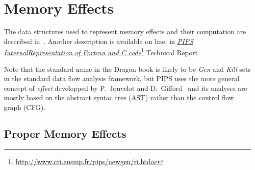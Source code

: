 \documentclass[a4paper]{report}
\newcommand{\LINK}[2]{\href{#2}{#1}\footnote{\url{#2}}\xspace}
\newcommand{\Pri}{\LINK{\emph{PIPS Internal\space{}Representation of
      Fortran and C code}}{http://www.cri.ensmp.fr/pips/newgen/ri.htdoc}}
\begin{document}
\section{Memory Effects}
\label{subsection-effects}

The data structures used to represent memory effects and their
computation are described in~\cite{IJT92}. Another description is
available on line, in \Pri{} Technical Report.

Note that the standard name in the Dragon book is likely to be {\em
  Gen} and {\em Kill} sets in the standard data flow analysis
framework, but PIPS uses the more general concept of {\em effect}
developped by P.~Jouvelot and D.~Gifford~\cite{JG89} and its analyses are mostly
based on the abstract syntac tree (AST) rather than the control flow
graph (CFG).

\subsection{Proper Memory Effects}
\label{subsubsection-proper-effects}
\end{document}
